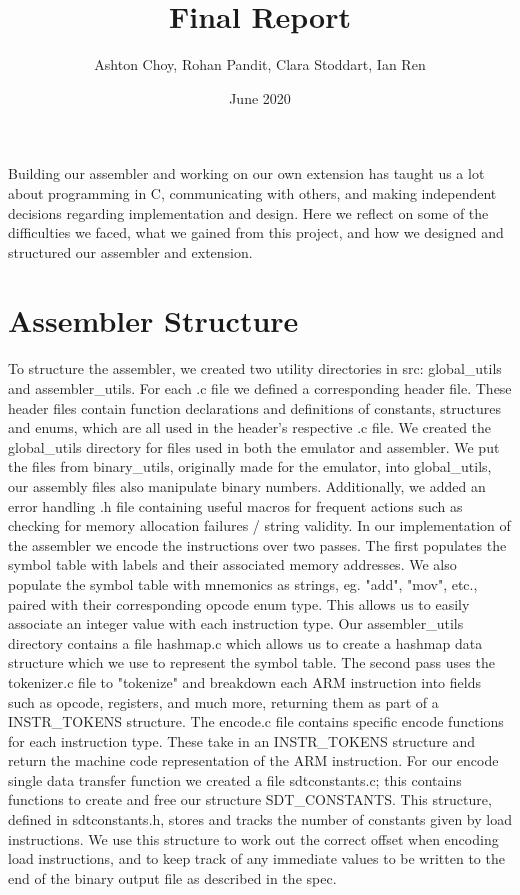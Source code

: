 \documentclass[11pt]{article}
\begin{document}
\title{Final Report}
\author{Ashton Choy, Rohan Pandit, Clara Stoddart, Ian Ren }
\date{June 2020}

\maketitle

Building our assembler and working on our own extension has taught us a lot about programming in C, communicating with others, and making independent decisions regarding implementation and design. Here we reflect on some of the difficulties we faced, what we gained from this project, and how we designed and structured our assembler and extension.

\section*{Assembler Structure}
To structure the assembler, we created two utility directories in src: global\_utils and assembler\_utils. For each .c file we defined a corresponding header file. These header files contain function declarations and definitions of constants, structures and enums, which are all used in the header's respective .c file. 
We created the global\_utils directory for files used in both the emulator and assembler. We put the files from binary\_utils, originally made for the emulator, into global\_utils, our assembly files also manipulate binary numbers. Additionally, we added an error handling .h file containing useful macros for frequent actions such as checking for memory allocation failures / string validity. In our implementation of the assembler we encode the instructions over two passes. The first populates the symbol table with labels and their associated memory addresses. We also populate the symbol table with mnemonics as strings, eg. "add", "mov", etc.,  paired with their corresponding opcode enum type. This allows us to easily associate an integer value with each instruction type. Our assembler\_utils directory contains a file hashmap.c which allows us to create a hashmap data structure which we use to represent the symbol table. The second pass uses the tokenizer.c file to "tokenize" and breakdown each ARM instruction into fields such as opcode, registers, and much more, returning them as part of a INSTR\_TOKENS structure. The encode.c file contains specific encode functions for each instruction type. These take in an INSTR\_TOKENS structure and return the machine code representation of the ARM instruction. For our encode single data transfer function we created a file sdtconstants.c; this contains functions to create and free our structure SDT\_CONSTANTS. This structure, defined in sdtconstants.h, stores and tracks the number of constants given by load instructions. We use this structure to work out the correct offset when encoding load instructions, and to keep track of any immediate values to be written to the end of the binary output file as described in the spec.
\end{document}
